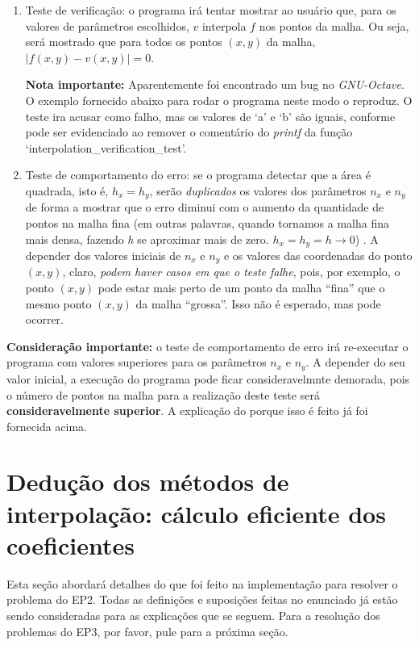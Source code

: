 \documentclass[11pt]{article}
\begin{document}
\begin{enumerate}
  \item Teste de verificação: o programa irá tentar mostrar ao usuário que, para os valores de parâmetros escolhidos, $v$ interpola $f$ nos pontos da malha. Ou seja, será mostrado
  que para todos os pontos $(x, y)$ da malha, $|f(x, y) - v(x, y)| = 0$.

  \textbf{Nota importante:} Aparentemente foi encontrado um bug no \textit{GNU-Octave}. O exemplo fornecido abaixo para rodar
  o programa neste modo o reproduz. O teste ira acusar como falho, mas os valores de `a' e `b' são iguais, conforme pode ser evidenciado ao remover o comentário do \textit{printf} da função `interpolation\_verification\_test'.
  \item Teste de comportamento do erro: se o programa detectar que a área é quadrada, isto é, $h_x = h_y$, serão \textit{duplicados} os valores dos parâmetros $n_x$ e $n_y$ de forma a mostrar
  que o erro diminui com o aumento da quantidade de pontos na malha fina (em outras palavras, quando tornamos a malha fina mais densa, fazendo \textit{h} se aproximar mais de zero. $h_x = h_y = h \rightarrow 0$) .
  A depender dos valores iniciais de $n_x$ e $n_y$ e os valores das coordenadas do ponto $(x, y)$, claro, \textit{podem haver casos em que o teste falhe}, pois, por exemplo, o ponto $(x, y)$
  pode estar mais perto de um ponto da malha ``fina'' que o mesmo ponto $(x, y)$ da malha ``grossa''. Isso não é esperado, mas pode ocorrer.
\end{enumerate}

\textbf{Consideração importante:} o teste de comportamento de erro irá re-executar o programa com valores superiores para os parâmetros $n_x$ e $n_y$. A depender do seu valor inicial,
a execução do programa pode ficar consideravelmnte demorada, pois o número de pontos na malha para a realização deste teste será \textbf{consideravelmente superior}. A explicação do porque isso é feito
já foi fornecida acima.

\pagebreak

\section{Dedução dos métodos de interpolação: cálculo eficiente dos coeficientes}

\indent\indent Esta seção abordará detalhes do que foi feito na
implementação para resolver o problema do EP2. Todas as definições e suposições
feitas no enunciado já estão sendo consideradas para as explicações que se
seguem. Para a resolução dos problemas do EP3, por favor, pule para a próxima seção.
\end{document}

